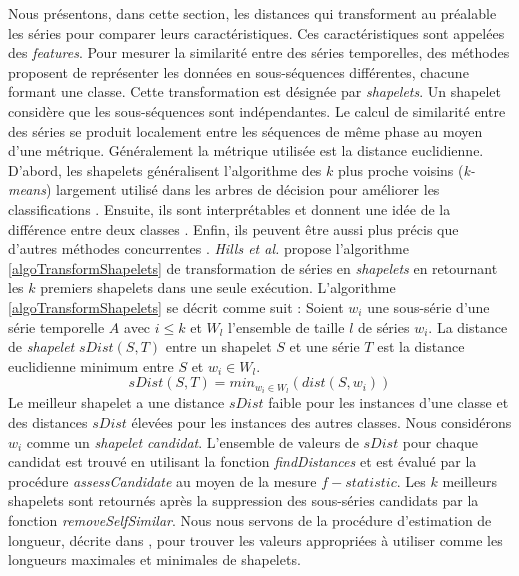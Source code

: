 Nous pr\'esentons, dans cette section,  les distances qui transforment au pr\'ealable les s\'eries pour comparer leurs caract\'eristiques. Ces caract\'eristiques sont appel\'ees des { \em features}. 
\newline
Pour mesurer la similarit\'e entre des s\'eries temporelles, des m\'ethodes proposent de repr\'esenter les donn\'ees en sous-s\'equences diff\'erentes, chacune formant une classe. Cette transformation est d\'esign\'ee par {\em shapelets}. Un shapelet consid\`ere que les sous-s\'equences sont ind\'ependantes. 
Le calcul de similarit\'e entre des s\'eries se produit localement entre les s\'equences de m\^eme phase au moyen d'une m\'etrique. G\'en\'eralement la m\'etrique utilis\'ee est la distance euclidienne. 
D'abord, les shapelets g\'en\'eralisent l'algorithme des $k$ plus proche voisins ({\em k-means}) largement utilis\'e dans les arbres de d\'ecision pour am\'eliorer les classifications \cite{wang2013experimental}. Ensuite, ils sont interpr\'etables et donnent une id\'ee de la diff\'erence entre deux classes \cite{ye2011time}. Enfin, ils peuvent \^etre aussi plus  pr\'ecis que d'autres m\'ethodes concurrentes \cite{mueen2011logical, ye2011time}.
\newline 
{\em Hills et al.} \cite{hills2014classificationShapelets} propose l'algorithme \ref{algoTransformShapelets} de transformation de s\'eries  en {\em shapelets} en retournant les $k$ premiers shapelets dans une seule ex\'ecution.
L'algorithme \ref{algoTransformShapelets} se d\'ecrit comme suit :
Soient $w_i$ une sous-s\'erie d'une s\'erie temporelle $A$ avec $i \le k$ et $W_l$ l'ensemble de taille $l$ de s\'eries $w_i$.
La distance de {\em shapelet}  $sDist(S, T)$ entre un shapelet $S$ et une s\'erie $T$ est la distance euclidienne minimum entre $S$ et $w_i \in W_l$.
$$
sDist(S, T) = min_{w_i \in W_l} (dist(S, w_i))
$$
Le meilleur shapelet a une distance $sDist$ faible pour les instances d'une classe et des distances $sDist$ \'elev\'ees pour les instances des autres classes.
\newline
Nous consid\'erons $w_i$ comme un {\em shapelet candidat}. L'ensemble de valeurs de $sDist$ pour chaque candidat est trouv\'e en utilisant la fonction {\em findDistances} et est \'evalu\'e par la proc\'edure {\em assessCandidate} au moyen de la mesure $f-statistic$. 
Les $k$ meilleurs shapelets sont retourn\'es apr\`es la suppression des sous-s\'eries candidats par la fonction {\em removeSelfSimilar}.
Nous nous servons de la proc\'edure d'estimation de longueur, d\'ecrite dans \cite{lines2012shapelet}, pour trouver les valeurs appropri\'ees \`a utiliser comme les longueurs maximales et minimales de shapelets. 
